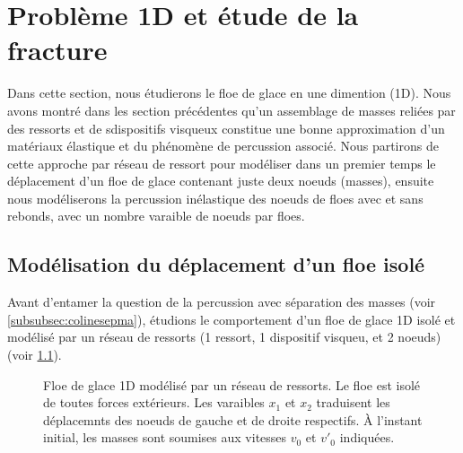 
\chapter{Problème 1D et étude de la fracture} %

\label{Chapter3} %





Dans cette section, nous étudierons le floe de glace en une dimention (1D). Nous avons montré dans les section précédentes qu'un assemblage de masses reliées par des ressorts et de sdispositifs visqueux constitue une bonne approximation d'un matériaux élastique et du phénomène de percussion associé. Nous partirons de cette approche par réseau de ressort pour modéliser dans un premier temps le déplacement d'un floe de glace contenant juste deux noeuds (masses), ensuite nous modéliserons la percussion inélastique des noeuds de floes avec et sans rebonds, avec un nombre varaible de noeuds par floes. 





\section{Modélisation du déplacement d'un floe isolé}
\label{subsubsec:moddep1D}


Avant d'entamer la question de la percussion avec séparation des masses (voir \cref{subsubsec:colinesepma}), étudions le comportement d'un floe de glace 1D isolé et modélisé par un réseau de ressorts (1 ressort, 1 dispositif visqueu, et 2 noeuds) (voir \cref{fig:deplacement1d}).
\begin{figure}[!h]
    \centering
    \caption{Floe de glace 1D modélisé par un réseau de ressorts. Le floe est isolé de toutes forces extérieurs. Les varaibles $x_1$ et $x_2$ traduisent les déplacemnts des noeuds de gauche et de droite respectifs. À l'instant initial, les masses sont soumises aux vitesses $v_0$ et $v'_0$ indiquées.}
    \label{fig:deplacement1d}
\end{figure}


